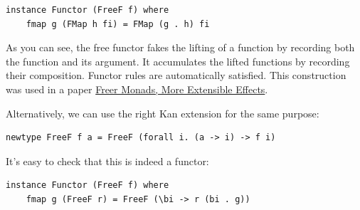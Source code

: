 \begin{Verbatim}[commandchars=\\\{\}]
instance Functor (FreeF f) where
    fmap g (FMap h fi) = FMap (g . h) fi
\end{Verbatim}
As you can see, the free functor fakes the lifting of a function by
recording both the function and its argument. It accumulates the lifted
functions by recording their composition. Functor rules are
automatically satisfied. This construction was used in a paper
\href{http://okmij.org/ftp/Haskell/extensible/more.pdf}{Freer Monads,
More Extensible Effects}.

Alternatively, we can use the right Kan extension for the same purpose:

\begin{Verbatim}[commandchars=\\\{\}]
newtype FreeF f a = FreeF (forall i. (a -> i) -> f i)
\end{Verbatim}
It's easy to check that this is indeed a functor:

\begin{Verbatim}
instance Functor (FreeF f) where
    fmap g (FreeF r) = FreeF (\bi -> r (bi . g))
\end{Verbatim}